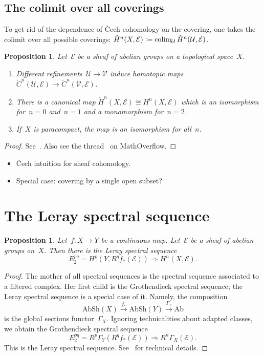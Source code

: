 \documentclass[10pt]{amsart}
\theoremstyle{definition}
\theoremstyle{plain}
\newtheorem{prop}[defn]{Proposition}
\theoremstyle{remark}
\newcommand{\E}{\mathcal{E}}
\newcommand{\U}{\mathcal{U}}
\newcommand{\V}{\mathcal{V}}
\newcommand{\Ab}{\mathrm{Ab}}
\newcommand{\AbSh}{\mathrm{AbSh}}
\newcommand{\defeq}{\vcentcolon=}
\DeclareMathOperator{\colim}{colim}
\newcommand{\stackhref}[1]{\href{http://stacks.math.columbia.edu/tag/#1}{#1}}
\begin{document}
\subsection{The colimit over all coverings}

To get rid of the dependence of Čech cohomology on the covering, one takes the
colimit over all possible coverings: $\check H^n(X,\E) \defeq \colim_\U \check
H^n(\U,\E)$.

\begin{prop}Let~$\E$ be a sheaf of abelian groups on a topological space~$X$.
\begin{enumerate}
\item Different refinements~$\U \to \V$ induce homotopic maps~$\check
C^n(\U,\E) \to \check C^n(\V,\E)$.
\item There is a canonical map $\check H^n(X,\E) \cong H^n(X,\E)$ which is an
isomorphism for~$n = 0$ and~$n = 1$ and a monomorphism for~$n = 2$.
\item If~$X$ is paracompact, the map is an isomorphism for all~$n$.
\end{enumerate}\end{prop}
\begin{proof}See~\cite{brady:sheaf-coh}. Also see the thread~\cite{mo:cech} on
MathOverflow.\end{proof}

\begin{itemize}
\item Čech intuition for sheaf cohomology.
\item Special case: covering by a single open subset?
\end{itemize}



\section{The Leray spectral sequence}

\begin{prop}Let~$f : X \to Y$ be a continuous map. Let~$\E$ be a sheaf of
abelian groups on~$X$. Then there is the \emph{Leray spectral sequence}
\[ E_2^{pq} = H^p(Y, R^q f_*(\E)) \Longrightarrow H^n(X, \E). \]
\end{prop}

\begin{proof}The mother of all spectral sequences is the spectral sequence
associated to a filtered complex. Her first child is the Grothendieck spectral
sequence; the Leray spectral sequence is a special case of it. Namely, the
composition
\[ \AbSh(X) \xrightarrow{f_*} \AbSh(Y) \xrightarrow{\Gamma_Y} \Ab \]
is the global sections functor~$\Gamma_X$. Ignoring technicalities about
adapted classes, we obtain the Grothendieck spectral sequence
\[ E_2^{pq} = R^p\Gamma_Y(R^q f_*(\E)) \Longrightarrow R^n\Gamma_X(\E). \]
This is the Leray spectral sequence.
See~\cite[Tag~\stackhref{0732}]{stacks-project} for technical details.
\end{proof}
\end{document}
